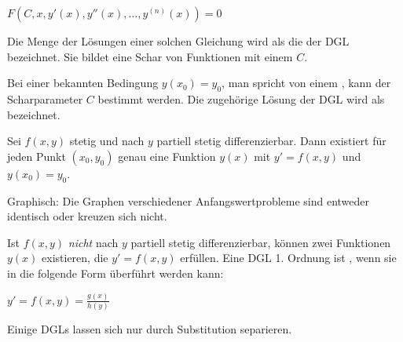 
\begin{formulabox}
    $\displaystyle F(C,x,y'(x),y''(x),\ldots,y^{(n)}(x))=0$
\end{formulabox}

Die Menge der Lösungen einer solchen Gleichung wird als die  der DGL bezeichnet. Sie bildet eine Schar von Funktionen mit einem  $C$.

Bei einer bekannten Bedingung $y(x_0)=y_0$, man spricht von einem , kann der Scharparameter $C$ bestimmt werden. Die zugehörige Lösung der DGL wird als  bezeichnet.

\begin{statementbox}[Existenzsatz]
Sei $f(x,y)$ stetig und nach $y$ partiell stetig differenzierbar. Dann existiert für jeden Punkt $(x_0,y_0)$ genau eine Funktion $y(x)$ mit $y'=f(x,y)$ und $y(x_0)=y_0$.

Graphisch: Die Graphen verschiedener Anfangswertprobleme sind entweder identisch oder kreuzen sich nicht.
\end{statementbox}

 Ist $f(x,y)$ \textit{nicht} nach $y$ partiell stetig differenzierbar, können zwei Funktionen $y(x)$ existieren, die $y'=f(x,y)$ erfüllen.
Eine DGL 1. Ordnung ist , wenn sie in die folgende Form überführt werden kann:
\begin{formulabox}
    $\displaystyle y' = f(x,y) = \frac{g(x)}{h(y)}$
\end{formulabox}

Einige DGLs lassen sich nur durch Substitution separieren.
\begin{procedure}
\end{procedure}

